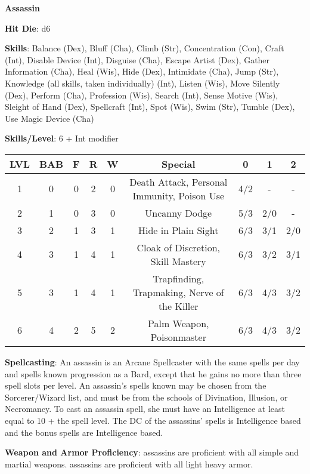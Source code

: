 \textbf{\huge{Assassin}}

\textbf{Hit Die}: d6

\textbf{Skills}: Balance (Dex), Bluff (Cha), Climb (Str), Concentration (Con), Craft (Int), Disable Device (Int), Disguise (Cha), Escape Artist (Dex), Gather Information (Cha), Heal (Wis), Hide (Dex), Intimidate (Cha), Jump (Str), Knowledge (all skills, taken individually) (Int), Listen (Wis), Move Silently (Dex), Perform (Cha), Profession (Wis), Search (Int), Sense Motive (Wis), Sleight of Hand (Dex), Spellcraft (Int), Spot (Wis), Swim (Str), Tumble (Dex), Use Magic Device (Cha)

\textbf{Skills/Level}: 6 + Int modifier

\begin{center}
\begin{small}
\begin{tabular}{| c | c | c | c | c | c | c | c | c |}
\hline
LVL &BAB &F &R &W &Special &0 &1 &2 \\
\hline
1 &0 &0 &2 &0 &Death Attack, Personal Immunity, Poison Use &4/2 &- &- \\
2 &1 &0 &3 &0 &Uncanny Dodge &5/3 &2/0 &- \\
3 &2 &1 &3 &1 &Hide in Plain Sight &6/3 &3/1 &2/0 \\
4 &3 &1 &4 &1 &Cloak of Discretion, Skill Mastery &6/3 &3/2 &3/1 \\
5 &3 &1 &4 &1 &Trapfinding, Trapmaking, Nerve of the Killer &6/3 &4/3 &3/2 \\
6 &4 &2 &5 &2 &Palm Weapon, Poisonmaster &6/3 &4/3 &3/2 \\
\hline
\end{tabular}
\end{small}
\end{center}

\textbf{Spellcasting}: An assassin is an Arcane Spellcaster with the same spells per day and spells known progression as a Bard, except that he gains no more than three spell slots per level. An assassin’s spells known may be chosen from the Sorcerer/Wizard list, and must be from the schools of Divination, Illusion, or Necromancy. To cast an assassin spell, she must have an Intelligence at least equal to 10 + the spell level. The DC of the assassins’ spells is Intelligence based and the bonus spells are Intelligence based.

\textbf{Weapon and Armor Proficiency}: assassins are proficient with all simple and martial weapons. assassins are proficient with all light heavy armor.

